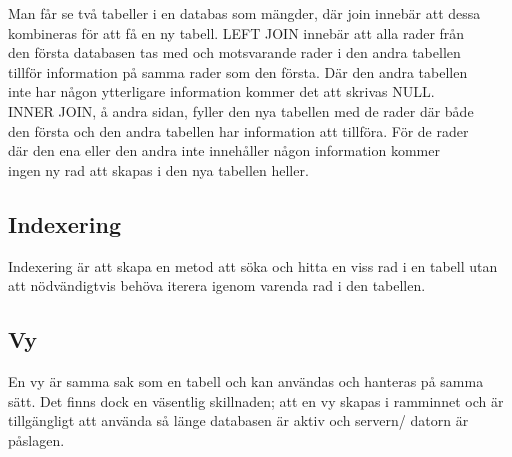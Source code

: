 \documentclass[10pt]{article}
\begin{document}
Man får se två tabeller i en databas som mängder, där join innebär att dessa \\
kombineras för att få en ny tabell. LEFT JOIN innebär att alla rader från \\
den första databasen tas med och motsvarande rader i den andra tabellen \\
tillför information på samma rader som den första. Där den andra tabellen \\
inte har någon ytterligare information kommer det att skrivas NULL. \\
INNER JOIN, å andra sidan, fyller den nya tabellen med de rader där både \\
den första och den andra tabellen har information att tillföra. För de rader \\
där den ena eller den andra inte innehåller någon information kommer \\
ingen ny rad att skapas i den nya tabellen heller.


\subsection{Indexering}

Indexering är att skapa en metod att söka och hitta en viss rad i en tabell utan att nödvändigtvis behöva iterera igenom varenda rad i den tabellen.

\subsection{Vy}

En vy är samma sak som en tabell och kan användas och hanteras på samma sätt. Det finns dock en väsentlig skillnaden; att en vy skapas i ramminnet och är tillgängligt att använda så länge databasen är aktiv och servern/ datorn är påslagen.
\end{document}
